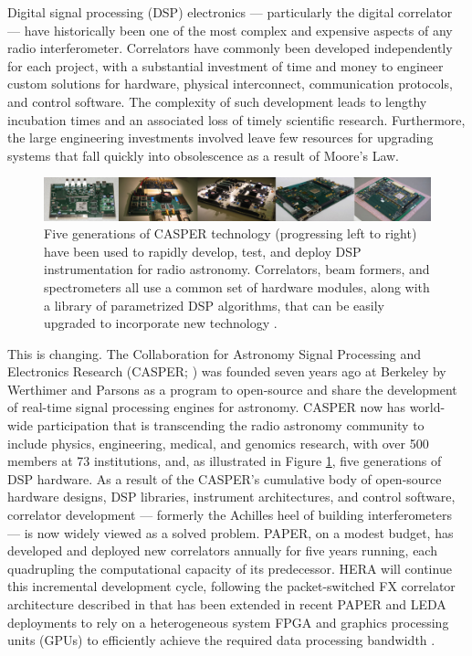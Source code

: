 \documentclass[preprint]{aastex}
\begin{document}
Digital signal processing (DSP) electronics --- particularly the digital correlator ---
have historically been one of the most complex and expensive aspects of any radio interferometer.
Correlators have commonly been
developed independently for each project, with a substantial investment
of time and money to engineer
custom solutions for hardware, physical interconnect,
communication protocols, and control software. The complexity of such development
leads to lengthy incubation times and an
associated loss of timely scientific research. Furthermore, the large
engineering investments involved leave few resources
for upgrading systems that fall quickly into obsolescence as a result
of Moore's Law.

\begin{figure}[!ht]\centering
\includegraphics[width=6.5in]{plots/casper_boards.jpg}
\caption{
Five generations of CASPER technology (progressing left to right) have been used to rapidly
develop, test, and deploy DSP instrumentation for radio astronomy.  Correlators,
beam formers, and spectrometers all use a common set of hardware modules, along with a library
of parametrized DSP algorithms, that can be easily upgraded to incorporate new technology
\citep{parsons_et_al2006,parsons_et_al2008}.
}\label{fig:casper_boards}
\end{figure}

This is changing.  The Collaboration for Astronomy Signal Processing and Electronics Research
(CASPER; \citealt{parsons_et_al2006}) was founded seven years ago at Berkeley
by Werthimer and Parsons as a program 
to open-source and share the development of real-time signal processing engines for astronomy.
CASPER now has world-wide participation that is
transcending the radio astronomy community to include physics, engineering,
medical, and genomics research, with
over 500 members at 73 institutions, and, as illustrated in
Figure \ref{fig:casper_boards}, five generations of DSP hardware.
As a result of the CASPER's cumulative body of open-source hardware designs, DSP libraries, instrument
architectures, and control software,
correlator development --- formerly the Achilles heel of building interferometers ---
is now widely viewed as a solved problem.  PAPER, on a modest budget, has developed and deployed new correlators
annually for five years running, each quadrupling the computational capacity of its predecessor.
HERA will continue this incremental development cycle, following the packet-switched
FX correlator architecture described in \citet{parsons_et_al2008} that has been
extended in recent PAPER and LEDA deployments to rely on a heterogeneous system FPGA and graphics processing units (GPUs)
to efficiently achieve the required data processing bandwidth \citep{clark_et_al2012}.
\end{document}
